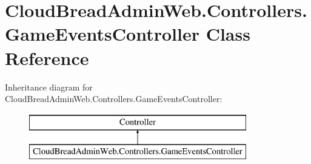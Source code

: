 \hypertarget{class_cloud_bread_admin_web_1_1_controllers_1_1_game_events_controller}{}\section{Cloud\+Bread\+Admin\+Web.\+Controllers.\+Game\+Events\+Controller Class Reference}
\label{class_cloud_bread_admin_web_1_1_controllers_1_1_game_events_controller}
Inheritance diagram for Cloud\+Bread\+Admin\+Web.\+Controllers.\+Game\+Events\+Controller\+:\begin{figure}[H]
\begin{center}
\leavevmode
\includegraphics[height=2.000000cm]{class_cloud_bread_admin_web_1_1_controllers_1_1_game_events_controller}
\end{center}
\end{figure}
